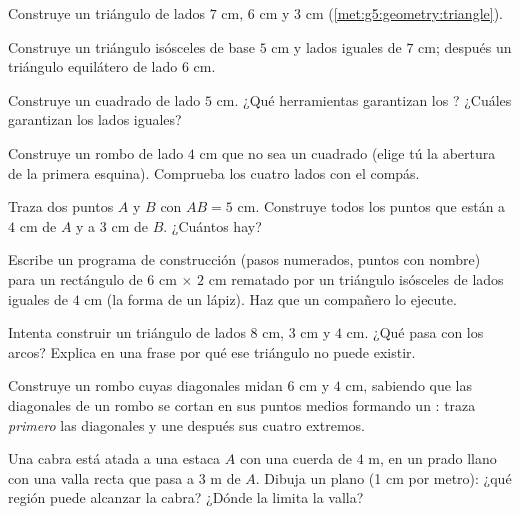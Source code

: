 \begin{exercise}[$\star$]\label{exo:g5:geometry:3}
Construye un triángulo de lados $7$ cm, $6$ cm y $3$ cm
(\cref{met:g5:geometry:triangle}).
\end{exercise}

\begin{exercise}[$\star$]\label{exo:g5:geometry:4}
Construye un triángulo isósceles de base $5$ cm y lados iguales de
$7$ cm; después un triángulo equilátero de lado $6$ cm.
\end{exercise}

\begin{exercise}[$\star$]\label{exo:g5:geometry:5}
Construye un cuadrado de lado $5$ cm. ¿Qué herramientas garantizan los ? ¿Cuáles garantizan los lados iguales?
\end{exercise}

\begin{exercise}[$\star$]\label{exo:g5:geometry:6}
Construye un rombo de lado $4$ cm que no sea un cuadrado (elige tú
la abertura de la primera esquina). Comprueba los cuatro lados con el
compás.
\end{exercise}

\begin{exercise}[$\star$]\label{exo:g5:geometry:7}
Traza dos puntos $A$ y $B$ con $AB = 5$ cm. Construye todos los puntos
que están a $4$ cm de $A$ y a $3$ cm de $B$. ¿Cuántos
hay?
\end{exercise}

\begin{exercise}[$\star$]\label{exo:g5:geometry:8}
Escribe un programa de construcción (pasos numerados, puntos con nombre) para un
rectángulo de $6$ cm $\times$ $2$ cm rematado por un triángulo isósceles
de lados iguales de $4$ cm (la forma de un lápiz). Haz que un compañero lo
ejecute.
\end{exercise}

\begin{exercise}[$\star\star$]\label{exo:g5:geometry:9}
Intenta construir un triángulo de lados $8$ cm, $3$ cm y $4$ cm.
¿Qué pasa con los arcos? Explica en una frase por qué ese
triángulo no puede existir.
\end{exercise}

\begin{exercise}[$\star\star$]\label{exo:g5:geometry:10}
Construye un rombo cuyas diagonales midan $6$ cm y $4$ cm,
sabiendo que las diagonales de un rombo se cortan en sus puntos medios formando un
: traza \emph{primero} las diagonales y une después sus cuatro
extremos.
\end{exercise}

\begin{exercise}[$\star\star$]\label{exo:g5:geometry:11}
Una cabra está atada a una estaca $A$ con una cuerda de $4$ m, en un prado llano con
una valla recta que pasa a $3$ m de $A$. Dibuja un plano (1 cm por
metro): ¿qué región puede alcanzar la cabra? ¿Dónde la limita la valla?
\end{exercise}
